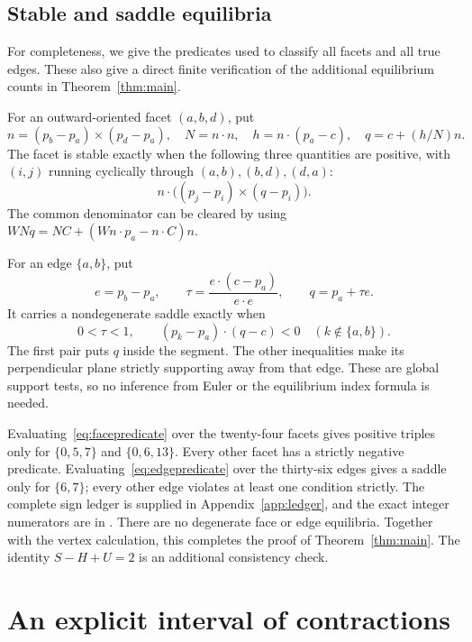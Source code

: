 \documentclass[11pt]{amsart}
\theoremstyle{remark}
\begin{document}
\subsection{Stable and saddle equilibria}\label{sec:census}
For completeness, we give the predicates used to classify all facets and all true edges. These also give a direct finite verification of the additional equilibrium counts in Theorem~\ref{thm:main}.

For an outward-oriented facet $(a,b,d)$, put
\[
 n=(p_b-p_a)\times(p_d-p_a),\quad N=n\cdot n,\quad
 h=n\cdot(p_a-c),\quad q=c+(h/N)n.
\]
The facet is stable exactly when the following three quantities are positive, with $(i,j)$ running cyclically through $(a,b),(b,d),(d,a)$:
\begin{equation}\label{eq:facepredicate}
 n\cdot\big((p_j-p_i)\times(q-p_i)\big).
\end{equation}
The common denominator can be cleared by using $WNq=NC+(Wn\cdot p_a-n\cdot C)n$.

For an edge $\{a,b\}$, put
\[
 e=p_b-p_a,\qquad
 \tau=\frac{e\cdot(c-p_a)}{e\cdot e},\qquad q=p_a+\tau e.
\]
It carries a nondegenerate saddle exactly when
\begin{equation}\label{eq:edgepredicate}
 0<\tau<1,\qquad (p_k-p_a)\cdot(q-c)<0
 \quad(k\notin\{a,b\}).
\end{equation}
The first pair puts $q$ inside the segment. The other inequalities make its perpendicular plane strictly supporting away from that edge. These are global support tests, so no inference from Euler or the equilibrium index formula is needed.

Evaluating~\eqref{eq:facepredicate} over the twenty-four facets gives positive triples only for $\{0,5,7\}$ and $\{0,6,13\}$. Every other facet has a strictly negative predicate. Evaluating~\eqref{eq:edgepredicate} over the thirty-six edges gives a saddle only for $\{6,7\}$; every other edge violates at least one condition strictly. The complete sign ledger is supplied in Appendix~\ref{app:ledger}, and the exact integer numerators are in . There are no degenerate face or edge equilibria. Together with the vertex calculation, this completes the proof of Theorem~\ref{thm:main}. The identity $S-H+U=2$ is an additional consistency check.

\section{An explicit interval of contractions}\label{sec:family}
\end{document}

